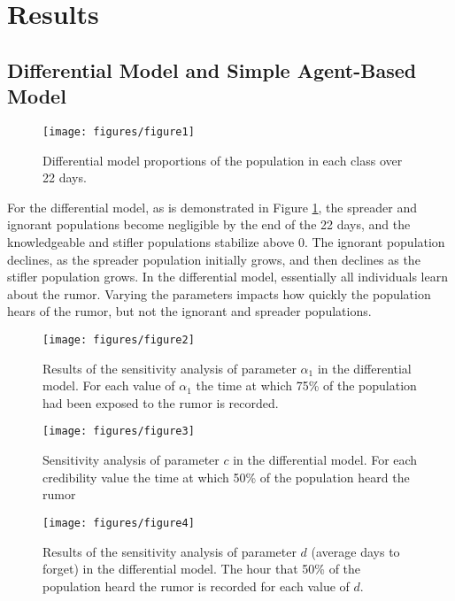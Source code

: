 \section{Results }
\label{sec:results}

\subsection{Differential Model and Simple Agent-Based Model}
\label{subsec:basicmod}

\begin{figure}[H]
\captionsetup{width=0.6\textwidth}
\centering
    \texttt{[image: figures/figure1]}
  \caption{ Differential model proportions of the population in each class over 22 days.
}
  \label{fig:figure1}
\end{figure}

For the differential model, as is demonstrated in Figure \ref{fig:figure1}, the spreader and ignorant populations become negligible by the end of the 22 days, and the knowledgeable and stifler populations stabilize above 0.
The ignorant population declines, as the spreader population initially grows, and then declines as the stifler population grows.
In the differential model, essentially all individuals learn about the rumor.
Varying the parameters impacts how quickly the population hears of the rumor, but not the ignorant and spreader populations.

\begin{figure}[H]
\captionsetup{width=0.8\textwidth}
\centering
    \texttt{[image: figures/figure2]}
  \caption{ Results of the sensitivity analysis of parameter $ \alpha_1 $ in the differential model.
For each value of $ \alpha_1 $ the time at which 75\% of the population had been exposed to the rumor is recorded.
}
  \label{fig:figure2}
\end{figure}

\begin{figure}[H]
\captionsetup{width=0.8\textwidth}
\centering
    \texttt{[image: figures/figure3]}
  \caption{ Sensitivity analysis of parameter $ c $ in the differential model.
For each credibility value the time at which 50\% of the population heard the rumor }
  \label{fig:figure3}
\end{figure}

\begin{figure}[H]
\captionsetup{width=0.8\textwidth}
\centering
    \texttt{[image: figures/figure4]}
  \caption{Results of the sensitivity analysis of parameter $ d $ (average days to forget) in the differential model.
The hour that 50\% of the population heard the rumor is recorded for each value of $ d $.}
  \label{fig:figure4}
\end{figure}

